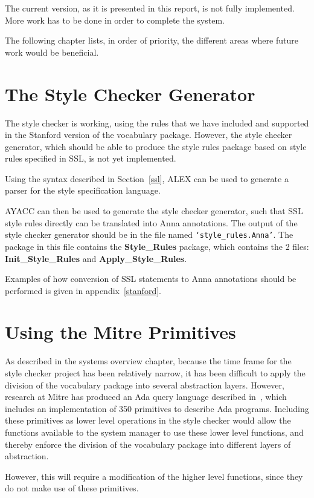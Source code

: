 The current version, as it is presented in this report, is not fully
implemented. More work has to be done in order to complete the system.

The following chapter lists, in order of priority, the different areas where
future work would be beneficial.

\section{The Style Checker Generator}
The style checker is working, using the rules that
we have included and supported in the Stanford version of the
vocabulary package.
However, the style checker generator, which should be able to produce the
style rules package based on style rules specified in SSL, is not yet
implemented.

Using the syntax described in Section~\ref{ssl}, ALEX can be used to
generate a parser for the style specification language.

AYACC can then be used to generate the style checker generator, such that
SSL style rules directly can be translated into
Anna annotations. The output of the style checker generator should be in the
file named {\tt `style\_rules.Anna'}. The package in this file contains the
 {\bf Style\_Rules} package, which contains the 2 files: {\bf Init\_Style\_Rules}
and {\bf Apply\_Style\_Rules}. 

Examples of how conversion of SSL statements to Anna annotations should
 be performed is given in appendix~\ref{stanford}.

\section{Using the Mitre Primitives}
As described in the systems overview chapter, because
 the time frame for the style checker project has been relatively narrow,
it has been difficult to apply the division of the vocabulary package into
several abstraction layers. 
However,
research at Mitre has produced an Ada query language described
in~\cite{MITRE},
which includes an implementation of 350 primitives to describe Ada programs.
Including these primitives as lower level operations in the style checker
would allow the functions available to the system manager to use these
lower level functions, and thereby enforce the division of the vocabulary 
package into different layers of abstraction.

However, this will require a modification of the higher level functions,
since they do not make use of these primitives.

